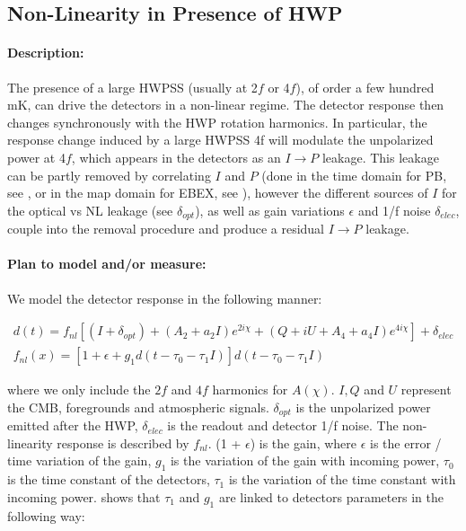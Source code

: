 \subsection{Non-Linearity in Presence of HWP}

\paragraph{Description:} 

The presence of a large HWPSS (usually at 2$f$ or 4$f$), of order a few hundred mK, can drive the detectors in a non-linear regime. The detector response then changes synchronously with the HWP rotation harmonics. In particular, the response change induced by a large HWPSS 4f will modulate the unpolarized power at 4$f$, which appears in the detectors as an $I \rightarrow P$ leakage. This leakage can be partly removed by correlating $I$ and $P$ (done in the time domain for PB, see \cite{PB1_WHWP}, or in the map domain for EBEX, see \cite{joy_thesis_2016}), however the different sources of $I$ for the optical vs NL leakage (see $\delta_{opt}$), as well as gain variations $\epsilon$ and 1/f noise $\delta_{elec}$, couple into the removal procedure and produce a residual $I \rightarrow P$ leakage.

  
\paragraph{Plan to model and/or measure:}
We model the detector response in the following manner:

\begin{align}
d(t) = f_{nl} \left[  (I+\delta_{opt}) + (A_2 + a_2 I) e^{2 i \chi} + (Q + iU + A_4 + a_4 I)  e^{4 i \chi} \right] + \delta_{elec} \\
f_{nl}(x) = \left[ 1 + \epsilon + g_1 d(t - \tau_0 - \tau_1 I) \right] d(t - \tau_0 - \tau_1 I)
\end{align}

\noindent where we only include the $2f$ and $4f$ harmonics for $A(\chi)$. $I, Q$ and $U$ represent the CMB, foregrounds and atmospheric signals. $\delta_{opt}$ is the unpolarized power emitted after the HWP, $\delta_{elec}$ is the readout and detector 1/f noise. The non-linearity response is described by $f_{nl}$. (1 + $\epsilon$) is the gain, where $\epsilon$ is the error / time variation of the gain, $g_1$ is the variation of the gain with incoming power, $\tau_0$ is the time constant of the detectors, $\tau_1$ is the variation of the time constant with incoming power. \cite{PB1_WHWP} shows that $\tau_1$ and $g_1$ are linked to detectors parameters in the following way:

